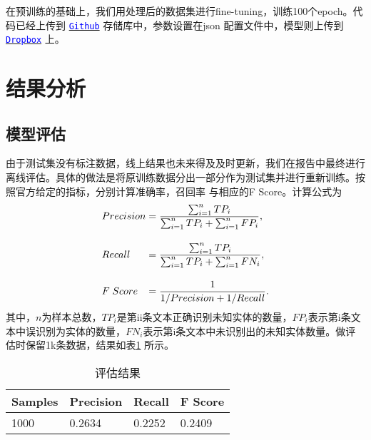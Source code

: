\documentclass[11pt]{article}
\begin{document}
在预训练的基础上，我们用处理后的数据集进行fine-tuning，训练100个epoch。代码已经上传到 \hyperref[code]{\texttt{\textcolor{blue}{Github}}} 存储库中，参数设置在json %
配置文件中，模型则上传到 \hyperref[code]{\texttt{\textcolor{blue}{Dropbox}}} 上。 

\section{结果分析}
\subsection{模型评估}
由于测试集没有标注数据，线上结果也未来得及及时更新，我们在报告中最终进行离线评估。具体的做法是将原训练数据分出一部分作为测试集并进行重新训练。按照官方给定的指标，分别计算准确率，召回率%
与相应的F Score。计算公式为
\begin{equation*}
    \begin{array}{l @{\; = \;} l}
        Precision & \displaystyle \frac{\sum_{i=1}^n TP_i}{\sum_{i=1}^nTP_i + \sum_{i=1}^nFP_{i}}, \\[20pt]
        Recall & \displaystyle \frac{\sum_{i=1}^n TP_i}{\sum_{i=1}^nTP_i + \sum_{i=1}^nFN_{i}}, \\[20pt]
        F \; Score & \displaystyle \frac{1}{1/Precision + 1/Recall}.
    \end{array}
\end{equation*}
其中，$n$为样本总数，$TP_i$是第ii条文本正确识别未知实体的数量，$FP_i$表示第i条文本中误识别为实体的数量，$FN_i$表示第i条文本中未识别出的未知实体数量。做评估时保留1k条数据，结果如表\ref{result} 所示。

\tabcolsep=20pt
\begin{table}[!ht]
    \centering
    \begin{tabular}{l l l l}
        \toprule
        Samples & Precision & Recall & F Score \\ \midrule
        1000    & 0.2634    & 0.2252    &  0.2409\\
        \bottomrule
    \end{tabular}
    \caption{评估结果}
    \label{result}
\end{table}
\end{document}
